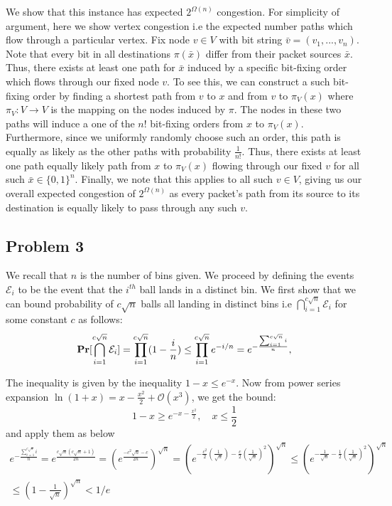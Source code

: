 \documentclass[12pt]{article}%
\begin{document}
We show that this instance has expected $2^{\Omega(n)}$ congestion. For simplicity of argument, here we show vertex congestion i.e the expected number paths which flow through a particular vertex. Fix node $v \in V$ with bit string ${\bar v} = (v_1,...,v_n)$. Note that every bit in all destinations $\pi({\bar x})$ differ from their packet sources ${\bar x}$. Thus, there exists at least one path for ${\bar x}$ induced by a specific bit-fixing order  which flows through our fixed node $v$. To see this, we can construct a such bit-fixing order by finding a shortest path from $v$ to $x$ and from $v$ to $\pi_V(x)$ where $\pi_V:V \rightarrow V$ is the mapping on the nodes induced by $\pi$. The nodes in these two paths will induce a one of the $n!$ bit-fixing orders from $x$ to $\pi_V(x)$. Furthermore, since we uniformly randomly choose such an order, this path is equally as likely as the other paths with probability $\frac{1}{n!}$. Thus, there exists at least one path equally likely path from $x$ to $\pi_V(x)$ flowing through our fixed $v$ for all such ${\bar x} \in \{0,1\}^n$. Finally, we note that this applies to all such $v \in V$, giving us our overall expected congestion of $2^{\Omega(n)}$ as every packet's path from its source to its destination is equally likely to pass through any such $v$.

\subsection*{Problem 3}
 We recall that $n$ is the number of bins given. We proceed by defining the events $\mathcal{E}_{i}$ to be the event that the $i^{th}$ ball lands in a distinct bin.  We first show that we can bound probability of $c\sqrt{n}$ balls all landing in distinct bins i.e $\bigcap_{i=1}^{c\sqrt{n}} \mathcal{E}_i$ for some constant $c$ as follows:
 \begin{gather*}
   {\bf Pr}[\bigcap_{i=1}^{c\sqrt{n}} \mathcal{E}_i] = \prod_{i=1}^{c\sqrt{n}} (1 - \frac{i}{n}) \leq \prod_{i=1}^{c\sqrt{n}} e^{-i/n} = e^{-\frac{ \sum_{i=1}^{c \sqrt{n}}i}{n}},
 \end{gather*}

 The inequality is given by the inequality $1 - x \leq e^{-x}$. Now from power series expansion $\ln{(1+x)} = x - \frac{x^2}{2} + \mathcal{O}(x^3)$,
 we get the bound:
 $$1-x \geq e^{-x - \frac{x^2}{2}}, \quad x \leq \frac{1}{2}$$
and apply them as below
\begin{gather*}
  e^{-\frac{ \sum_{i=1}^{c \sqrt{n}}i}{n}} = e^{\frac{c\sqrt{n}(c\sqrt{n}+1)}{2n}} = (e^{\frac{-c^2\sqrt{n} - c}{2n}})^{\sqrt{n}} = (e^{-\frac{c^2}{2}(\frac{1}{\sqrt{n}}) - \frac{c}{2}(\frac{1}{\sqrt{n}})^2})^{\sqrt{n}} \leq (e^{-\frac{1}{\sqrt{n}} - \frac{1}{2}(\frac{1}{\sqrt{n}})^2})^{\sqrt{n}} \\
  \leq (1 - \frac{1}{\sqrt{n}})^{\sqrt{n}} < 1/e
\end{gather*}
\end{document}
